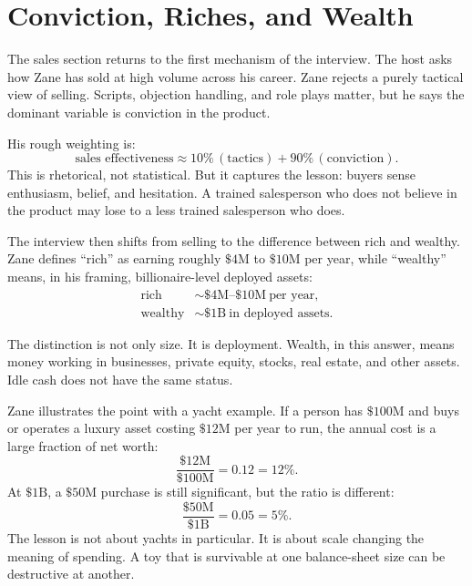 \section{Conviction, Riches, and Wealth}

The sales section returns to the first mechanism of the interview. The host asks how Zane has sold at high volume across his career. Zane rejects a purely tactical view of selling. Scripts, objection handling, and role plays matter, but he says the dominant variable is conviction in the product.

His rough weighting is:
\begin{equation}
\text{sales effectiveness}
\approx
10\%\,(\text{tactics})+90\%\,(\text{conviction}).
\end{equation}
This is rhetorical, not statistical. But it captures the lesson: buyers sense enthusiasm, belief, and hesitation. A trained salesperson who does not believe in the product may lose to a less trained salesperson who does.

The interview then shifts from selling to the difference between rich and wealthy. Zane defines ``rich'' as earning roughly \(\$4\mathrm{M}\) to \(\$10\mathrm{M}\) per year, while ``wealthy'' means, in his framing, billionaire-level deployed assets:
\begin{align}
\text{rich} &\sim \$4\mathrm{M}\text{--}\$10\mathrm{M}\ \text{per year},\\
\text{wealthy} &\sim \$1\mathrm{B}\ \text{in deployed assets}.
\end{align}

The distinction is not only size. It is deployment. Wealth, in this answer, means money working in businesses, private equity, stocks, real estate, and other assets. Idle cash does not have the same status.

Zane illustrates the point with a yacht example. If a person has \(\$100\mathrm{M}\) and buys or operates a luxury asset costing \(\$12\mathrm{M}\) per year to run, the annual cost is a large fraction of net worth:
\begin{equation}
\frac{\$12\mathrm{M}}{\$100\mathrm{M}}
=
0.12
=
12\%.
\end{equation}
At \(\$1\mathrm{B}\), a \(\$50\mathrm{M}\) purchase is still significant, but the ratio is different:
\begin{equation}
\frac{\$50\mathrm{M}}{\$1\mathrm{B}}
=
0.05
=
5\%.
\end{equation}
The lesson is not about yachts in particular. It is about scale changing the meaning of spending. A toy that is survivable at one balance-sheet size can be destructive at another.

